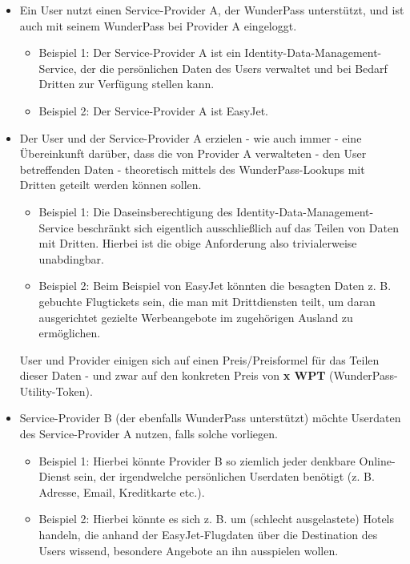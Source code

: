 \begin{Solution}

\begin{itemize}
  \item Ein User nutzt einen Service-Provider A, der WunderPass unterstützt, und ist auch mit seinem WunderPass bei Provider A eingeloggt.
  \begin{itemize}
  	\item Beispiel 1: Der Service-Provider A ist ein Identity-Data-Management-Service, der die persönlichen Daten des Users verwaltet und bei Bedarf Dritten zur Verfügung stellen kann.
  	\item Beispiel 2: Der Service-Provider A ist EasyJet.
  \end{itemize}
  \item Der User und der Service-Provider A erzielen - wie auch immer - eine Übereinkunft darüber, dass die von Provider A verwalteten - den User betreffenden Daten - theoretisch mittels des WunderPass-Lookups mit Dritten geteilt werden können sollen. 
  \begin{itemize}
  	\item Beispiel 1: Die Daseinsberechtigung des Identity-Data-Management-Service beschränkt sich eigentlich ausschließlich auf das Teilen von Daten mit Dritten. Hierbei ist die obige Anforderung also trivialerweise unabdingbar.
  	\item Beispiel 2: Beim Beispiel von EasyJet könnten die besagten Daten z. B. gebuchte Flugtickets sein, die man mit Drittdiensten teilt, um daran ausgerichtet gezielte Werbeangebote im zugehörigen Ausland zu ermöglichen.
  \end{itemize}
  User und Provider einigen sich auf einen Preis/Preisformel für das Teilen dieser Daten - und zwar auf den konkreten Preis von \textbf{x WPT} (WunderPass-Utility-Token).
  \item Service-Provider B (der ebenfalls WunderPass unterstützt) möchte Userdaten des Service-Provider A nutzen, falls solche vorliegen.
  \begin{itemize}
  	\item Beispiel 1: Hierbei könnte Provider B so ziemlich jeder denkbare Online-Dienst sein, der irgendwelche persönlichen Userdaten benötigt (z. B. Adresse, Email, Kreditkarte etc.).
  	\item Beispiel 2: Hierbei könnte es sich z. B. um (schlecht ausgelastete) Hotels handeln, die anhand der EasyJet-Flugdaten über die Destination des Users wissend, besondere Angebote an ihn ausspielen wollen.

\end{itemize}
\end{itemize}
\end{Solution}

